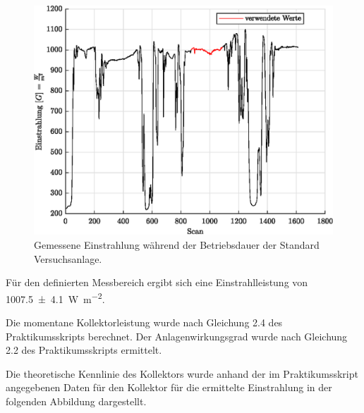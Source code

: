 \begin{figure}[H]
	\centering
	\includegraphics[height=0.3\textheight]{../DATA/DataEinstrahlung.eps}
	\caption[Gemessene Einstrahlung während der Betriebsdauer der Standard Versuchsanlage]{Gemessene Einstrahlung während der Betriebsdauer der Standard Versuchsanlage.}
	\label{fig:Einstrahlung}
\end{figure}

Für den definierten Messbereich ergibt sich eine Einstrahlleistung von \SI{1007.5(41)}{\watt\per\meter\squared}.
 
Die momentane Kollektorleistung wurde nach Gleichung 2.4 des Praktikumsskripts berechnet. Der Anlagenwirkungsgrad wurde nach Gleichung 2.2 des Praktikumsskripts ermittelt. 


Die theoretische Kennlinie des Kollektors wurde anhand der im Praktikumsskript angegebenen Daten für den Kollektor für die ermittelte Einstrahlung in der folgenden Abbildung dargestellt.

